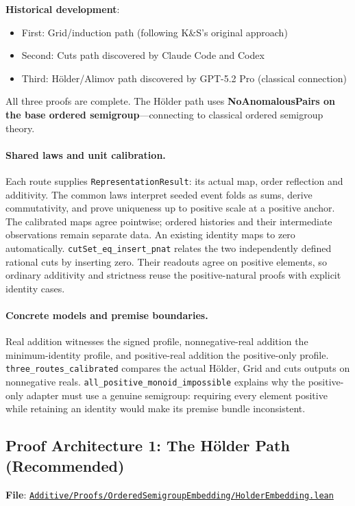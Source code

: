 \documentclass[11pt]{article}
\theoremstyle{definition}
\theoremstyle{remark}
\begin{document}
\textbf{Historical development}:
\begin{itemize}
\item First: Grid/induction path (following K\&S's original approach)
\item Second: Cuts path discovered by Claude Code and Codex
\item Third: Hölder/Alimov path discovered by GPT-5.2 Pro (classical connection)
\end{itemize}

All three proofs are complete. The Hölder path uses \textbf{NoAnomalousPairs on the base ordered semigroup}---connecting
to classical ordered semigroup theory.

\paragraph{Shared laws and unit calibration.}
Each route supplies \texttt{RepresentationResult}: its actual map, order reflection
and additivity. The common laws interpret seeded event folds as sums, derive
commutativity, and prove uniqueness up to positive scale at a positive anchor.
The calibrated maps agree pointwise; ordered histories and their intermediate
observations remain separate data. An existing identity maps to zero automatically.
\texttt{cutSet\_eq\_insert\_pnat} relates the two independently defined rational
cuts by inserting zero. Their readouts agree on positive elements, so ordinary
additivity and strictness reuse the positive-natural proofs with explicit identity cases.
\paragraph{Concrete models and premise boundaries.}
Real addition witnesses the signed profile, nonnegative-real addition the
minimum-identity profile, and positive-real addition the positive-only profile.
\texttt{three\_routes\_calibrated} compares the actual Hölder, Grid and cuts outputs
on nonnegative reals. \texttt{all\_positive\_monoid\_impossible} explains why the
positive-only adapter must use a genuine semigroup: requiring every element
positive while retaining an identity would make its premise bundle inconsistent.

\subsection{Proof Architecture 1: The Hölder Path (Recommended)}

\textbf{File}: \href{https://github.com/zariuq/ks-foundations-of-inference/blob/main/KnuthSkilling/Additive/Proofs/OrderedSemigroupEmbedding/HolderEmbedding.lean}{\texttt{Additive/Proofs/OrderedSemigroupEmbedding/HolderEmbedding.lean}}
\end{document}
